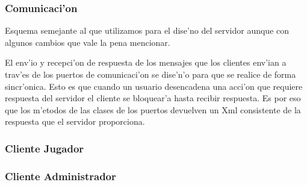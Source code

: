 \subsubsection{Comunicaci'on}
Esquema semejante al que utilizamos para el dise'no del servidor aunque con algunos cambios que vale la pena mencionar.

El env'io y recepci'on de respuesta de los mensajes que los clientes env'ian a trav'es de los puertos de comunicaci'on se dise'n'o para que se realice de forma sincr'onica.
Esto es que cuando un usuario desencadena una acci'on que requiere respuesta del servidor el cliente se bloquear'a hasta recibir respuesta. Es por eso que los m'etodos de las clases de los puertos devuelven un Xml consistente de la respuesta que el servidor proporciona.

\subsubsection{Cliente Jugador}


\subsubsection{Cliente Administrador}

